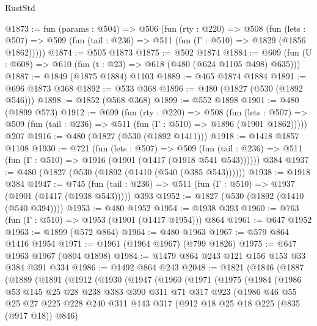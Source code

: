 \begin{lexlean}{RustStd}
\begin{coremodule}
{\begin{coremodule}
{{{{{{{{{@1873 := fun (params : @504) =>
  @506
    (fun (rty : @220) =>
    @508
      (fun (lets : @507) =>
      @509 (fun (tail : @236) => @511 (fun (Γ : @510) => @1829 (@1856 @1862)))))
@1874 := @505 @1873
@1875 := @502 @1874
@1884 := @609 (fun (U : @608) => @610 (fun (t : @23) => @618 (@480 (@624 @1105 @498) @635)))
@1887 := @1849 (@1875 @1884) @1103
@1889 := @465 @1874 @1884
@1891 := @696 @1873 @368
@1892 := @533 @368
@1896 := @480 (@1827 (@530 (@1892 @546)))
@1898 := @1852 (@568 @368)
@1899 := @552 @1898
@1901 := @480 (@1899 @573)
@1912 := @699
    (fun (rty : @220) =>
    @508
      (fun (lets : @507) =>
      @509 (fun (tail : @236) => @511 (fun (Γ : @510) => @1896 (@1901 @1862)))))
    @207
@1916 := @480 (@1827 (@530 (@1892 @1411)))
@1918 := @1418 @1857 @1108
@1930 := @721
    (fun (lets : @507) =>
    @509 (fun (tail : @236) => @511 (fun (Γ : @510) => @1916 (@1901 (@1417 (@1918 @541 @543))))))
    @384
@1937 := @480 (@1827 (@530 (@1892 (@1410 (@540 (@385 @543))))))
@1938 := @1918 @384
@1947 := @745
    (fun (tail : @236) => @511 (fun (Γ : @510) => @1937 (@1901 (@1417 (@1938 @543)))))
    @393
@1952 := @1827 (@530 (@1892 (@1410 (@540 @394))))
@1953 := @480 @1952
@1954 := @1938 @393
@1960 := @763 (fun (Γ : @510) => @1953 (@1901 (@1417 @1954))) @864
@1961 := @647 @1952
@1963 := @1899 (@572 @864)
@1964 := @480 @1963
@1967 := @579 @864 @1416 @1954
@1971 := @1961 (@1964 @1967) (@799 @1826)
@1975 := @647 @1963 @1967 (@804 @1898)
@1984 := @1479 @864 @243 @121 @156 @153 @33 @384 @391 @334
@1986 := @1492 @864 @243
@2048 := @1821
    (@1846
      (@1887
        (@1889
          (@1891
            (@1912
              (@1930
                (@1947
                  (@1960
                    (@1971
                      (@1975
                        (@1984
                          (@1986
                            @53
                            @145
                            @25
                            @28
                            @238
                            @383
                            @390
                            @311
                            @71
                            @317
                            @923
                            (@1986
                              @46
                              @55
                              @25
                              @27
                              @225
                              @228
                              @240
                              @311
                              @143
                              @317
                              (@912 @18 @25 @18 @225 (@835 (@917 @18)) @846)
}}}}}}}}}
\end{coremodule}}
\end{coremodule}
\end{lexlean}
